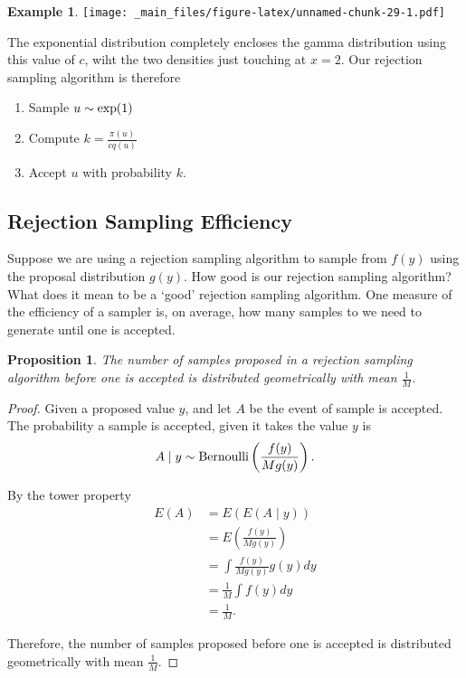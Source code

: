 \documentclass[
]{book}
\providecommand{\tightlist}{%
  \setlength{\itemsep}{0pt}\setlength{\parskip}{0pt}}
\newtheorem{proposition}{Proposition}[chapter]
\theoremstyle{definition}
\theoremstyle{definition}
\newtheorem{example}{Example}[chapter]
\theoremstyle{definition}
\theoremstyle{definition}
\theoremstyle{remark}
\begin{document}
\begin{example}
\texttt{[image: \_main\_files/figure-latex/unnamed-chunk-29-1.pdf]}

The exponential distribution completely encloses the gamma distribution using this value of \(c\), wiht the two densities just touching at \(x=2\). Our rejection sampling algorithm is therefore

\begin{enumerate}
\def\labelenumi{\arabic{enumi}.}
\tightlist
\item
  Sample \(u \sim \hbox{exp}(1)\)
\item
  Compute \(k = \frac{\pi(u)}{cq(u)}\)
\item
  Accept \(u\) with probability \(k\).
\end{enumerate}

\end{example}

\hypertarget{rejection-sampling-efficiency}{%
\subsection{Rejection Sampling Efficiency}\label{rejection-sampling-efficiency}}

Suppose we are using a rejection sampling algorithm to sample from \(f(y)\) using the proposal distribution \(g(y)\). How good is our rejection sampling algorithm? What does it mean to be a `good' rejection sampling algorithm. One measure of the efficiency of a sampler is, on average, how many samples to we need to generate until one is accepted.

\begin{proposition}
The number of samples proposed in a rejection sampling algorithm before one is accepted is distributed geometrically with mean \(\frac{1}{M}\).
\end{proposition}

\begin{proof}
Given a proposed value \(y\), and let \(A\) be the event of sample is accepted. The probability a sample is accepted, given it takes the value \(y\) is
\[
A \mid y \sim \hbox{Bernoulli}\left(\frac{f(y)}{Mg(y)}\right).
\]

By the tower property
\begin{align*}
E(A) & = E(E(A\mid y)) \\
& = E\left(\frac{f(y)}{Mg(y)}\right) \\
& = \int \frac{f(y)}{Mg(y)} g(y) dy \\
& = \frac{1}{M}\int f(y) dy \\
& = \frac{1}{M}.
\end{align*}

Therefore, the number of samples proposed before one is accepted is distributed geometrically with mean \(\frac{1}{M}\).
\end{proof}
\end{document}
